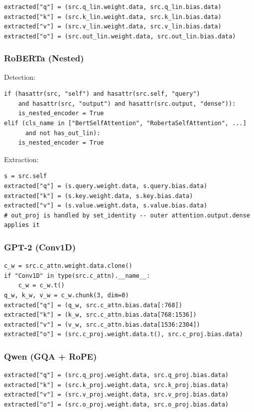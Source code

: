 \begin{lstlisting}
extracted["q"] = (src.q_lin.weight.data, src.q_lin.bias.data)
extracted["k"] = (src.k_lin.weight.data, src.k_lin.bias.data)
extracted["v"] = (src.v_lin.weight.data, src.v_lin.bias.data)
extracted["o"] = (src.out_lin.weight.data, src.out_lin.bias.data)
\end{lstlisting}

\subsubsection{RoBERTa (Nested)}

Detection:

\begin{lstlisting}
if (hasattr(src, "self") and hasattr(src.self, "query")
    and hasattr(src, "output") and hasattr(src.output, "dense")):
    is_nested_encoder = True
elif (cls_name in ["BertSelfAttention", "RobertaSelfAttention", ...]
      and not has_out_lin):
    is_nested_encoder = True
\end{lstlisting}

Extraction:

\begin{lstlisting}
s = src.self
extracted["q"] = (s.query.weight.data, s.query.bias.data)
extracted["k"] = (s.key.weight.data, s.key.bias.data)
extracted["v"] = (s.value.weight.data, s.value.bias.data)
# out_proj is handled by set_identity -- outer attention.output.dense applies it
\end{lstlisting}

\subsubsection{GPT-2 (Conv1D)}

\begin{lstlisting}
c_w = src.c_attn.weight.data.clone()
if "Conv1D" in type(src.c_attn).__name__:
    c_w = c_w.t()
q_w, k_w, v_w = c_w.chunk(3, dim=0)
extracted["q"] = (q_w, src.c_attn.bias.data[:768])
extracted["k"] = (k_w, src.c_attn.bias.data[768:1536])
extracted["v"] = (v_w, src.c_attn.bias.data[1536:2304])
extracted["o"] = (src.c_proj.weight.data.t(), src.c_proj.bias.data)
\end{lstlisting}

\subsubsection{Qwen (GQA + RoPE)}

\begin{lstlisting}
extracted["q"] = (src.q_proj.weight.data, src.q_proj.bias.data)
extracted["k"] = (src.k_proj.weight.data, src.k_proj.bias.data)
extracted["v"] = (src.v_proj.weight.data, src.v_proj.bias.data)
extracted["o"] = (src.o_proj.weight.data, src.o_proj.bias.data)
\end{lstlisting}

